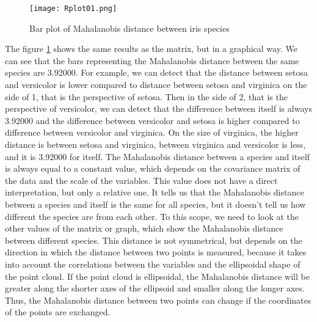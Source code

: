 \documentclass[article]{jss}
\begin{document}
\begin{figure}
    \center
    \texttt{[image: Rplot01.png]}
    \caption{Bar plot of Mahalanobis distance between iris species}
    \label{fig:barplot}
\end{figure}

The figure \ref{fig:barplot} shows the same results as the matrix, but in a graphical way. We can see that the bars representing the Mahalanobis distance between the same species are 3.92000. For example, we can detect that the distance between setosa and versicolor is lower compared to distance between setosa and virginica on the side of 1, that is the perspective of setosa. Then in the side of 2, that is the perspective of versicolor, we can detect that the difference between itself is always 3.92000 and the difference between versicolor and setosa is higher compared to difference between versicolor and virginica. On the size of virginica, the higher distance is between setosa and virginica, between virginica and versicolor is less, and it is 3.92000 for itself.
The Mahalanobis distance between a species and itself is always equal to a constant value, which depends on the covariance matrix of the data and the scale of the variables. This value does not have a direct interpretation, but only a relative one. It tells us that the Mahalanobis distance between a species and itself is the same for all species, but it doesn't tell us how different the species are from each other. To this scope, we need to look at the other values of the matrix or graph, which show the Mahalanobis distance between different species. This distance is not symmetrical, but depends on the direction in which the distance between two points is measured, because it takes into account the correlations between the variables and the ellipsoidal shape of the point cloud. If the point cloud is ellipsoidal, the Mahalanobis distance will be greater along the shorter axes of the ellipsoid and smaller along the longer axes. Thus, the Mahalanobis distance between two points can change if the coordinates of the points are exchanged.
\end{document}
